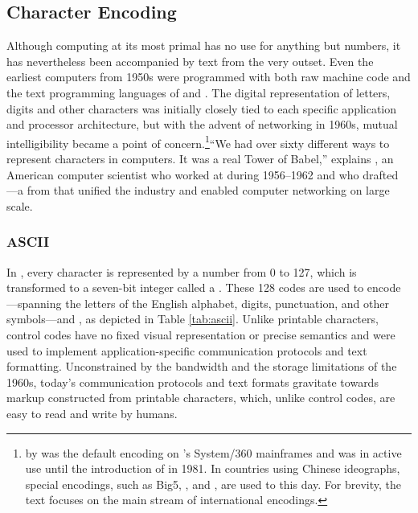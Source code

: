 \documentclass{book}
\begin{document}
\subsection{Character Encoding}
Although computing at its most primal has no use for anything but numbers, it
has nevertheless been accompanied by text from the very outset. Even the
earliest computers from 1950s were programmed with both raw machine code and
the text programming languages of  and . The
digital representation of letters, digits and other characters was initially
closely tied to each specific application and processor architecture, but with
the advent of networking in 1960s, mutual intelligibility became a point of
concern.\footnote{
   by  was the default encoding on
  's System/360 mainframes and was in active use until the
  introduction of  in 1981. In countries using Chinese ideographs,
  special encodings, such as Big5, , and , are used to
  this day. For brevity, the text focuses on the main stream of international
  encodings.
}``We had over sixty different ways to represent characters in
computers. It was a real Tower of Babel,'' explains \cite{brandel99}
, an American computer scientist who worked at 
during 1956--1962 and who drafted ---a
 from \citeyear{asa63} that unified the industry and
enabled computer networking on large scale.

\subsubsection{ASCII}
In , every character is represented by a number from 0 to 127,
which is transformed to a seven-bit integer called a .
These 128 codes are used to encode ---spanning
the letters of the English alphabet, digits, punctuation, and other
symbols---and , as depicted in Table \ref{tab:ascii}.
Unlike printable characters, control codes have no fixed visual representation
or precise semantics and were used to implement application-specific
communication protocols and text formatting. Unconstrained by the bandwidth and
the storage limitations of the 1960s, today's communication protocols and text
formats gravitate towards markup constructed from printable characters, which,
unlike control codes, are easy to read and write by humans.
\end{document}
